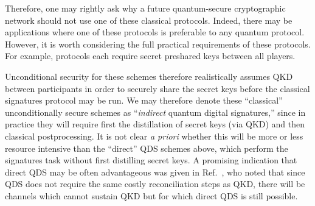 Therefore, one may rightly ask why a future quantum-secure cryptographic network should not use one of these classical protocols. Indeed, there may be applications where one of these protocols is preferable to any quantum protocol. However, it is worth considering the full practical requirements of these protocols. For example, protocols \cite{Wallden2015, Amiri2016a} each require secret preshared keys between all players. 

Unconditional security for these schemes therefore realistically assumes QKD between participants in order to securely share the secret keys before the classical signatures protocol may be run. We may therefore denote these ``classical'' unconditionally secure schemes as ``\emph{indirect} quantum digital signatures,'' since in practice they will require first the distillation of secret keys (via QKD) and then classical postprocessing. It is not clear \emph{a priori} whether this will be more or less resource intensive than the ``direct'' QDS schemes above, which perform the signatures task without first distilling secret keys. A promising indication that direct QDS may be often advantageous was given in Ref.~\cite{Amiri2016}, who noted that since QDS does not require the same costly reconciliation steps as QKD, there will be channels which cannot sustain QKD but for which direct QDS is still possible.


%

